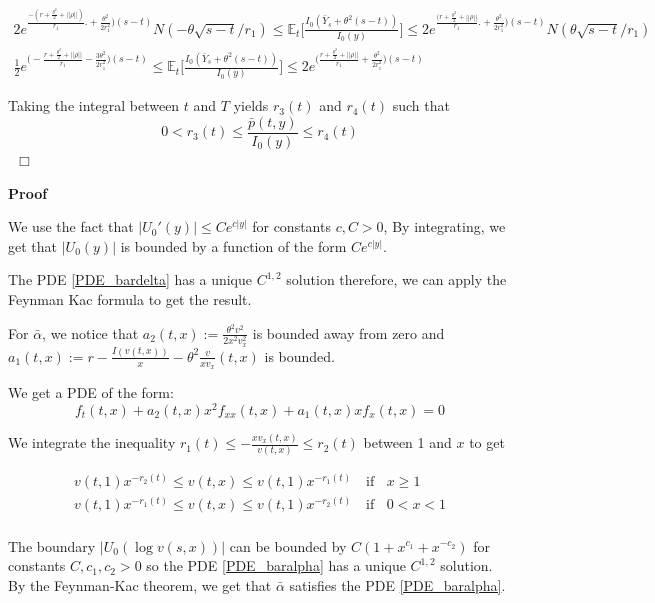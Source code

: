 \documentclass[11pt, psfig]{article}
\theoremstyle{definition}
\theoremstyle{remark}
\numberwithin{equation}{section}
\def\sE{\mathbb{E}}
\def \proof{{\noindent \bf Proof}\quad}
\def \ep{\hbox{ }\hfill$\Box$}
\begin{document}
\begin{eqnarray*}
2e^{\frac{-(r+\frac{\theta^2}{2}+||\rho||)}{r_1}.+\frac{\theta^2}{2r_1^2})(s-t)}N( - \theta \sqrt{s-t}/r_1   ) \leq \sE_t\big[\frac{I_0(\bar{Y}_s+\theta^2(s-t))}{I_0(y)}\big] \leq 2e^{\frac{(r+\frac{\theta^2}{2}+||\rho||}{r_1}.+\frac{\theta^2}{2r_1^2})(s-t)}N(  \theta \sqrt{s-t}/r_1   )\\
\frac{1}{2}e^{\big(-\frac{r+\frac{\theta^2}{2}+||\rho||}{r_1}-\frac{3\theta^2}{2r_1^2}\big)(s-t)} \leq \sE_t\big[\frac{I_0(\bar{Y}_s+\theta^2(s-t))}{I_0(y)}\big] \leq 2e^{\big(\frac{r+\frac{\theta^2}{2}+||\rho||}{r_1}+\frac{\theta^2}{2r_1^2}\big)(s-t)}
\end{eqnarray*}

Taking the integral between $t$ and $T$ yields $r_3(t)$ and $r_4(t)$ such that
$$0< r_3(t) \leq \frac{\bar{p}(t,y)}{I_0(y)} \leq r_4(t)$$
\ep






\proof{Proposition \ref{PDE_alpha_delta}}

We use the fact that  $|U_0'(y)| \leq Ce^{c|y|}$ for constants $c, C>0$, By integrating, we get that
 $|U_0(y)|$ is bounded by a function of the form $Ce^{c|y|}$.

The PDE \eqref{PDE_bardelta} has a unique $C^{1,2}$ solution therefore, we can apply the Feynman Kac formula to get the result.

For $\bar{\alpha}$, we notice that $a_2(t,x):=\frac{\theta^2 v^2}{2x^2 v_x^2}$ is bounded away from zero and $a_1(t,x):=r  - \frac{I(v(t,x))}{x}-\theta^2 \frac{v}{x v_{x}}(t, x)$ is bounded.

We get a PDE of the form: 
$$ f_t(t,x)+ a_2(t,x)x^2 f_{xx}(t,x)+a_1(t,x) x f_x(t,x)=0$$ 

We integrate the inequality $r_1(t)\leq -\frac{xv_x(t,x)}{v(t,x)}\leq r_2(t)$ between 1 and $x$ to get
%

\begin{eqnarray*}\label{boundsv}
v(t,1) x^{-r_2(t)}\leq v(t,x)\leq v(t,1) x^{-r_1(t)} \quad \text{if }\;\; x\geq 1\\
v(t,1) x^{-r_1(t)}\leq v(t,x)\leq v(t,1) x^{-r_2(t)} \quad \text{if }  \;\; 0< x< 1\\
\end{eqnarray*}

%

The boundary $|U_0(\log v(s,x))|$ can be bounded by $C(1+x^{c_1}+x^{-c_2})$ for constants $C, c_1, c_2>0$ so the PDE \eqref{PDE_baralpha} 
has a unique $C^{1,2}$ solution. By the Feynman-Kac theorem, we get that 
$\bar{\alpha}$ satisfies the PDE \eqref{PDE_baralpha}.
\end{document}
